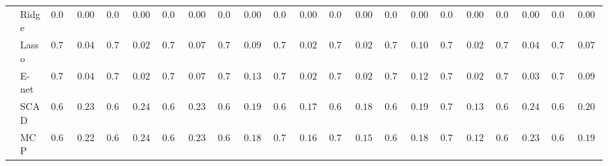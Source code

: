 \begin{tabular}{ll|ll|llllll|llllll|llllll}
 & Ridge  & $0.000$ & $0.0000$ & $0.000$ & $0.0000$ & $0.000$ & $0.0000$ & $0.000$ & $0.0000$ & $0.000$ & $0.0000$ & $0.000$ & $0.0000$ & $0.000$ & $0.0000$ & $0.000$ & $0.0000$ & $0.000$ & $0.0000$ & $0.000$ & $0.0000$ \\
 & Lasso  & $0.794$ & $0.0445$ & $0.796$ & $0.0281$ & $0.778$ & $0.0746$ & $0.762$ & $0.0930$ & $0.798$ & $0.0200$ & $0.798$ & $0.0200$ & $0.756$ & $0.1085$ & $0.798$ & $0.0200$ & $0.788$ & $0.0477$ & $0.778$ & $0.0799$ \\
 & E-net  & $0.794$ & $0.0445$ & $0.796$ & $0.0281$ & $0.778$ & $0.0746$ & $0.740$ & $0.1318$ & $0.798$ & $0.0200$ & $0.796$ & $0.0281$ & $0.742$ & $0.1281$ & $0.798$ & $0.0200$ & $0.792$ & $0.0394$ & $0.772$ & $0.0944$ \\
 & SCAD  & $0.640$ & $0.2395$ & $0.640$ & $0.2494$ & $0.612$ & $0.2341$ & $0.694$ & $0.1958$ & $0.684$ & $0.1710$ & $0.688$ & $0.1849$ & $0.670$ & $0.1957$ & $0.734$ & $0.1304$ & $0.634$ & $0.2413$ & $0.660$ & $0.2040$ \\
 & MCP  & $0.678$ & $0.2290$ & $0.668$ & $0.2465$ & $0.642$ & $0.2383$ & $0.690$ & $0.1850$ & $0.722$ & $0.1630$ & $0.726$ & $0.1599$ & $0.694$ & $0.1808$ & $0.746$ & $0.1201$ & $0.666$ & $0.2328$ & $0.688$ & $0.1996$ \\
\hline 
\end{tabular}

